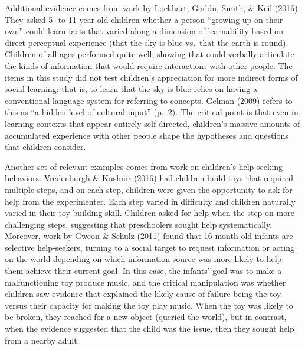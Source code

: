 \documentclass[oneside]{report}
\begin{document}
Additional evidence comes from work by Lockhart, Goddu, Smith, \& Keil
(2016). They asked 5- to 11-year-old children whether a person ``growing
up on their own'' could learn facts that varied along a dimension of
learnability based on direct perceptual experience (that the sky is blue
vs.~that the earth is round). Children of all ages performed quite well,
showing that could verbally articulate the kinds of information that
would require interactions with other people. The items in this study
did not test children's appreciation for more indirect forms of social
learning: that is, to learn that the sky is blue relies on having a
conventional language system for referring to concepts. Gelman (2009)
refers to this as ``a hidden level of cultural input'' (p.~2). The
critical point is that even in learning contexts that appear entirely
self-directed, children's massive amounts of accumulated experience with
other people shape the hypotheses and questions that children consider.

Another set of relevant examples comes from work on children's
help-seeking behaviors. Vredenburgh \& Kushnir (2016) had children build
toys that required multiple steps, and on each step, children were given
the opportunity to ask for help from the experimenter. Each step varied
in difficulty and children naturally varied in their toy building skill.
Children asked for help when the step on more challenging steps,
suggesting that preschoolers sought help systematically. Moreover, work
by Gweon \& Schulz (2011) found that 16-month-old infants are selective
help-seekers, turning to a social target to request information or
acting on the world depending on which information source was more
likely to help them achieve their current goal. In this case, the
infants' goal was to make a malfunctioning toy produce music, and the
critical manipulation was whether children saw evidence that explained
the likely cause of failure being the toy versus their capacity for
making the toy play music. When the toy was likely to be broken, they
reached for a new object (queried the world), but in contrast, when the
evidence suggested that the child was the issue, then they sought help
from a nearby adult.
\end{document}
